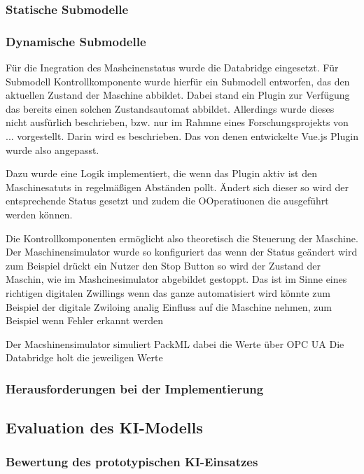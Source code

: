 \subsubsection{Statische Submodelle}

\subsubsection{Dynamische Submodelle}

Für die Inegration des Mashcinenstatus wurde die Databridge eingesetzt.
Für Submodell Kontrollkomponente wurde hierfür ein Submodell entworfen, das den aktuellen Zustand der Maschine abbildet.
Dabei stand ein Plugin zur Verfügung das bereits einen solchen Zustandsautomat abbildet.
Allerdings wurde dieses nicht ausfürlich beschrieben, bzw. nur im Rahmne eines Forschungsprojekts von ... vorgestellt.
Darin wird es beschrieben.
Das von denen entwickelte Vue.js Plugin wurde also angepasst.

Dazu wurde eine Logik implementiert, die wenn das Plugin aktiv ist den Maschinesatuts in regelmäßigen Abständen pollt.
Ändert sich dieser so wird der entsprechende Status gesetzt und zudem die OOperatiuonen die ausgeführt werden können.

Die Kontrollkomponenten ermöglicht also theoretisch die Steuerung der Maschine.
Der Maschinensimulator wurde so konfiguriert das wenn der Status geändert wird zum Beispiel drückt ein Nutzer den Stop Button so wird der Zustand der Maschin, wie im Mashcinesimulator abgebildet gestoppt.
Das ist im Sinne eines richtigen digitalen Zwillings wenn das ganze automatisiert wird könnte zum Beispiel der digitale Zwiloing analig Einfluss auf die Maschine nehmen, zum Beispiel wenn Fehler erkannt werden



Der Macshinensimulator simuliert PackML dabei die Werte über OPC UA
Die Databridge holt die jeweiligen Werte

\subsubsection{Herausforderungen bei der Implementierung}

\subsection{Evaluation des KI-Modells}
\subsubsection{Bewertung des prototypischen KI-Einsatzes}
